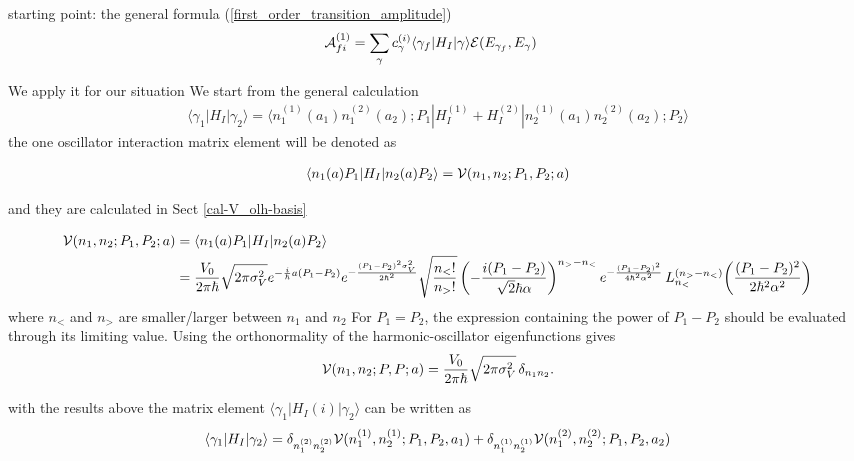 starting point: the general formula (\ref{first_order_transition_amplitude})
\begin{align}
  {\cal A}_{fi}^{(1)} & =\sum_\gamma {c_\gamma^{(i)}} \langle \gamma_f|H_I|\gamma\rangle  {\cal E}(E_{\gamma_f},E_\gamma)\label{first_order_transition_amplitude-used}
\end{align}

We apply it for our situation
We start from the general calculation
\begin{align}
  \langle \gamma_1|H_I|\gamma_2\rangle = \langle n^{(1)}_1(a_1)n_1^{(2)}(a_2);P_1|H_{I}^{(1)}+H_{I}^{(2)}|n_2^{(1)}(a_1)n_2^{(2)}(a_2);P_2\rangle
\end{align}
the one oscillator interaction matrix element will be denoted as
\begin{importantbox}
  \begin{align}
    \langle n_1(a) P_1|H_I|n_2(a) P_2\rangle={\cal V}(n_1,n_2; P_1, P_2; a)\label{one-absorber-matrix-element}
  \end{align}
\end{importantbox}
and they are calculated in Sect \ref{cal-V_olh-basis}
\begin{importantbox}
  \begin{align}
    {\cal V}(n_1,n_2;P_1,P_2;a)&= \langle n_1(a) P_1|H_I|n_2(a) P_2\rangle  \nonumber\\
    &= \frac{V_0}{2\pi\hbar}\sqrt{{2\pi\sigma_V^2}} e^{-\frac{i}{\hbar}a(P_1-P_2)}e^{-\frac{(P_1-P_2)^2\sigma_V^2}{2\hbar^2}}\sqrt{\frac{n_<!}{n_>!}} \left(-\frac{i (P_1-P_2)  }{\sqrt{2}\hbar\alpha}\right)^{n_> - n_<} e^{-\frac{(P_1-P_2)^2 }{4\hbar^2\alpha^2}} \, L_{n_<}^{(n_> - n_<)}\!\left(\frac{(P_1-P_2)^2 }{2\hbar^2\alpha^2}\right)\label{cal-V_n1n2p1p2-use}
  \end{align}
  where $n_<$ and $n_>$ are smaller/larger between $n_1$ and $n_2$
  For $P_1=P_2$, the expression containing the power of $P_1-P_2$
  should be evaluated through its limiting value.  Using the
  orthonormality of the harmonic-oscillator eigenfunctions gives
  \begin{align}
    {\cal V}(n_1,n_2;P,P;a)
    = \frac{V_0}{2\pi\hbar}\sqrt{2\pi\sigma_V^2}\,
    \delta_{n_1n_2}.\label{cal-V_n1n2p1p2-spec-use}
  \end{align}
\end{importantbox}
with the results above the matrix element $ \langle \gamma_1|H_I{(i)}|\gamma_2\rangle$ can be written as
\begin{align}
  \langle \gamma_1|H_I|\gamma_2\rangle = \delta_{n_1^{(2)}n_2^{(2)}}{\cal V}(n_1^{(1)},n_2^{(1)};P_1,P_2,a_1)+\delta_{n_1^{(1)}n_2^{(1)}}{\cal V}(n_1^{(2)},n_2^{(2)};P_1,P_2,a_2)
\end{align}
